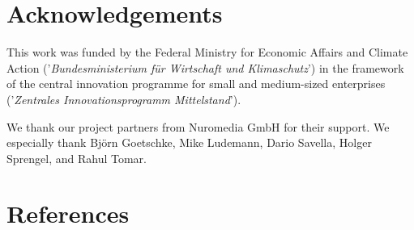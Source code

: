 \documentclass[runningheads]{llncs}
\begin{document}
\section*{Acknowledgements}

This work was funded by the Federal Ministry for Economic Affairs and Climate Action
('\textsl{Bundesministerium f\"ur Wirtschaft und Klimaschutz}')
in the framework of the central innovation programme
for small and medium-sized enterprises
('\textsl{Zentrales Innovationsprogramm Mittelstand}').

We thank our project partners from Nuromedia GmbH for their support.
We especially thank Björn Goetschke, Mike Ludemann, Dario Savella, Holger Sprengel, and Rahul Tomar.


\section*{References}

%
%


%

\end{document}
